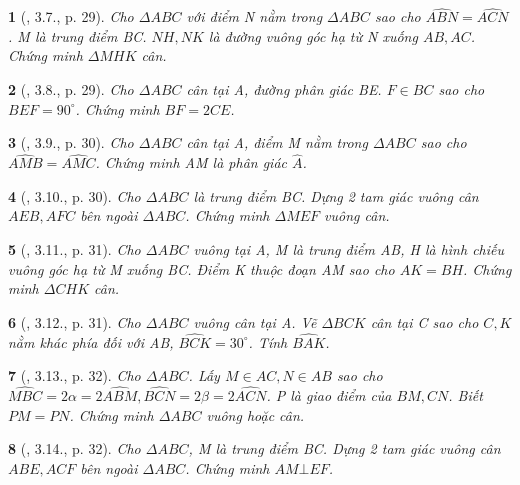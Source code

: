 \documentclass{article}
\newtheorem{baitoan}{}
\begin{document}
\begin{baitoan}[\cite{Hung_Mai_Toan_7_hinh_hoc}, 3.7., p. 29]
	Cho $\Delta ABC$ với điểm N nằm trong $\Delta ABC$ sao cho $\widehat{ABN} = \widehat{ACN}$. M là trung điểm BC. $NH,NK$ là đường vuông góc hạ từ N xuống $AB,AC$. Chứng minh $\Delta MHK$ cân.
\end{baitoan}

\begin{baitoan}[\cite{Hung_Mai_Toan_7_hinh_hoc}, 3.8., p. 29]
	Cho $\Delta ABC$ cân tại A, đường phân giác BE. $F\in BC$ sao cho $\widehat{BEF} = 90^\circ$. Chứng minh $BF = 2CE$.
\end{baitoan}

\begin{baitoan}[\cite{Hung_Mai_Toan_7_hinh_hoc}, 3.9., p. 30]
	Cho $\Delta ABC$ cân tại A, điểm M nằm trong $\Delta ABC$ sao cho $\widehat{AMB} = \widehat{AMC}$. Chứng minh AM là phân giác $\widehat{A}$.
\end{baitoan}

\begin{baitoan}[\cite{Hung_Mai_Toan_7_hinh_hoc}, 3.10., p. 30]
	Cho $\Delta ABC$ là trung điểm BC. Dựng 2 tam giác vuông cân $AEB,AFC$ bên ngoài $\Delta ABC$. Chứng minh $\Delta MEF$ vuông cân.
\end{baitoan}

\begin{baitoan}[\cite{Hung_Mai_Toan_7_hinh_hoc}, 3.11., p. 31]
	Cho $\Delta ABC$ vuông tại A, M là trung điểm AB, H là hình chiếu vuông góc hạ từ M xuống BC. Điểm K thuộc đoạn AM sao cho $AK = BH$. Chứng minh $\Delta CHK$ cân.
\end{baitoan}

\begin{baitoan}[\cite{Hung_Mai_Toan_7_hinh_hoc}, 3.12., p. 31]
	Cho $\Delta ABC$ vuông cân tại A. Vẽ $\Delta BCK$ cân tại C sao cho $C,K$ nằm khác phía đối với AB, $\widehat{BCK} = 30^\circ$. Tính $\widehat{BAK}$.
\end{baitoan}

\begin{baitoan}[\cite{Hung_Mai_Toan_7_hinh_hoc}, 3.13., p. 32]
	Cho $\Delta ABC$. Lấy $M\in AC,N\in AB$ sao cho $\widehat{MBC} = 2\alpha = 2\widehat{ABM},\widehat{BCN} = 2\beta = 2\widehat{ACN}$. P là giao điểm của $BM,CN$. Biết $PM = PN$. Chứng minh $\Delta ABC$ vuông hoặc cân.
\end{baitoan}

\begin{baitoan}[\cite{Hung_Mai_Toan_7_hinh_hoc}, 3.14., p. 32]
	Cho $\Delta ABC$, M là trung điểm BC. Dựng 2 tam giác vuông cân $ABE,ACF$ bên ngoài $\Delta ABC$. Chứng minh $AM\bot EF$.
\end{baitoan}
\end{document}
